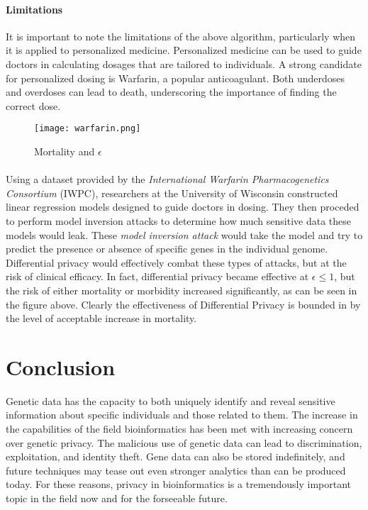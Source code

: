 \paragraph{Limitations}

It is important to note the limitations of the above algorithm, particularly when it is applied to personalized medicine. Personalized medicine can be used to guide doctors in calculating dosages that are tailored to individuals. A strong candidate for personalized dosing is Warfarin, a popular anticoagulant. Both underdoses and overdoses can lead to death, underscoring the importance of finding the correct dose.

\begin{center}
\begin{figure}[t!]
\texttt{[image: warfarin.png]}
\centering
\caption{Mortality and $\epsilon$}
\end{figure}
\end{center}

\paragraph{}
Using a dataset provided by the \textit{International Warfarin Pharmacogenetics Consortium} (IWPC), researchers at the University of Wisconsin constructed linear regression models designed to guide doctors in dosing. They then proceded to perform model inversion attacks to determine how much sensitive data these models would leak. These \textit{model inversion attack} would take the model and try to predict the presence or absence of specific genes in the individual genome.\cite{warfarin} Differential privacy would effectively combat these types of attacks, but at the risk of clinical efficacy. In fact, differential privacy became effective at $\epsilon \leq 1$, but the risk of either mortality or morbidity increased significantly, as can be seen in the figure above. Clearly the effectiveness of Differential Privacy is bounded in by the level of acceptable increase in mortality.

\section{Conclusion}

Genetic data has the capacity to both uniquely identify and reveal sensitive information about specific individuals and those related to them. The increase in the capabilities of the field bioinformatics has been met with increasing concern over genetic privacy. The malicious use of genetic data can lead to discrimination, exploitation, and identity theft. Gene data can also be stored indefinitely, and future techniques may tease out even stronger analytics than can be produced today. For these reasons, privacy in bioinformatics is a tremendously important topic in the field now and for the forseeable future.

